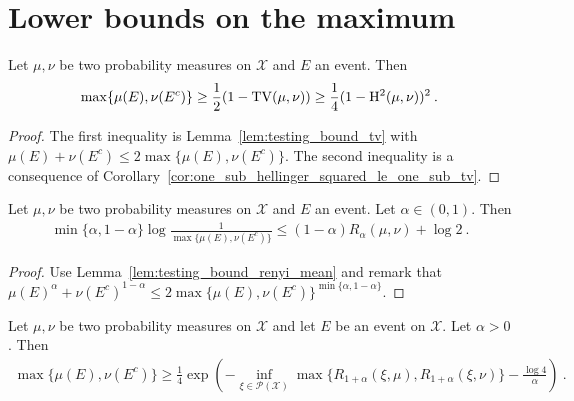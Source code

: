\section{Lower bounds on the maximum}

\begin{lemma}
  \label{lem:testing_bound_tv_hellinger_max}
  Let $\mu, \nu$ be two probability measures on $\mathcal X$ and $E$ an event. Then
  \begin{align*}
  \max\{\mu(E), \nu(E^c)\}
  \ge \frac{1}{2}(1 - \operatorname{TV}(\mu, \nu))
  \ge \frac{1}{4}(1 - \operatorname{H^2}(\mu, \nu))^2
  \: .
  \end{align*}
\end{lemma}

\begin{proof}
The first inequality is Lemma~\ref{lem:testing_bound_tv} with $\mu(E) + \nu(E^c) \le 2 \max\{\mu(E), \nu(E^c)\}$.
The second inequality is a consequence of Corollary~\ref{cor:one_sub_hellinger_squared_le_one_sub_tv}.
\end{proof}

\begin{lemma}
  \label{lem:testing_bound_renyi_max}
  Let $\mu, \nu$ be two probability measures on $\mathcal X$ and $E$ an event. Let $\alpha \in (0,1)$. Then
  \begin{align*}
  \min\{\alpha, 1 - \alpha\} \log\frac{1}{\max\{\mu(E), \nu(E^c)\}} \le (1 - \alpha) R_{\alpha}(\mu, \nu)  + \log 2 \: .
  \end{align*}
\end{lemma}

\begin{proof}
Use Lemma~\ref{lem:testing_bound_renyi_mean} and remark that $\mu(E)^\alpha + \nu(E^c)^{1 - \alpha} \le 2\max\{\mu(E), \nu(E^c)\}^{\min\{\alpha, 1 - \alpha\}}$.
\end{proof}


\begin{lemma}
  \label{lem:testing_bound_renyi_one_add}
  Let $\mu, \nu$ be two probability measures on $\mathcal X$ and let $E$ be an event on $\mathcal X$. Let $\alpha > 0$. Then
  \begin{align*}
  \max\{\mu(E), \nu(E^c)\} \ge \frac{1}{4}\exp\left( - \inf_{\xi \in \mathcal P(\mathcal X)}\max\{R_{1+\alpha}(\xi, \mu), R_{1+\alpha}(\xi, \nu)\} - \frac{\log 4}{\alpha}\right) \: .
  \end{align*}
\end{lemma}

